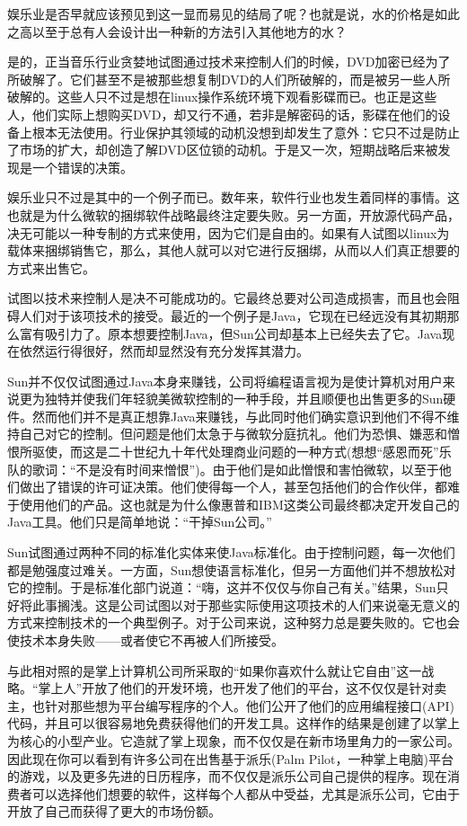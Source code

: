 娱乐业是否早就应该预见到这一显而易见的结局了呢？也就是说，水的价格是如此之高以至于总有人会设计出一种新的方法引入其他地方的水？

是的，正当音乐行业贪婪地试图通过技术来控制人们的时候，DVD加密已经为了所破解了。它们甚至不是被那些想复制DVD的人们所破解的，而是被另一些人所破解的。这些人只不过是想在linux操作系统环境下观看影碟而已。也正是这些人，他们实际上想购买DVD，却又行不通，若非是解密码的话，影碟在他们的设备上根本无法使用。行业保护其领域的动机没想到却发生了意外：它只不过是防止了市场的扩大，却创造了解DVD区位锁的动机。于是又一次，短期战略后来被发现是一个错误的决策。

娱乐业只不过是其中的一个例子而已。数年来，软件行业也发生着同样的事情。这也就是为什么微软的捆绑软件战略最终注定要失败。另一方面，开放源代码产品，决无可能以一种专制的方式来使用，因为它们是自由的。如果有人试图以linux为载体来捆绑销售它，那么，其他人就可以对它进行反捆绑，从而以人们真正想要的方式来出售它。

试图以技术来控制人是决不可能成功的。它最终总要对公司造成损害，而且也会阻碍人们对于该项技术的接受。最近的一个例子是Java，它现在已经远没有其初期那么富有吸引力了。原本想要控制Java，但Sun公司却基本上已经失去了它。Java现在依然运行得很好，然而却显然没有充分发挥其潜力。

Sun并不仅仅试图通过Java本身来赚钱，公司将编程语言视为是使计算机对用户来说更为独特并使我们年轻貌美微软控制的一种手段，并且顺便也出售更多的Sun硬件。然而他们并不是真正想靠Java来赚钱，与此同时他们确实意识到他们不得不维持自己对它的控制。但问题是他们太急于与微软分庭抗礼。他们为恐惧、嫌恶和憎恨所驱使，而这是二十世纪九十年代处理商业问题的一种方式(想想“感恩而死”乐队的歌词：“不是没有时间来憎恨”)。由于他们是如此憎恨和害怕微软，以至于他们做出了错误的许可证决策。他们使得每一个人，甚至包括他们的合作伙伴，都难于使用他们的产品。这也就是为什么像惠普和IBM这类公司最终都决定开发自己的Java工具。他们只是简单地说：“干掉Sun公司。”

Sun试图通过两种不同的标准化实体来使Java标准化。由于控制问题，每一次他们都是勉强度过难关。一方面，Sun想使语言标准化，但另一方面他们并不想放松对它的控制。于是标准化部门说道：“嗨，这并不仅仅与你自己有关。”结果，Sun只好将此事搁浅。这是公司试图以对于那些实际使用这项技术的人们来说毫无意义的方式来控制技术的一个典型例子。对于公司来说，这种努力总是要失败的。它也会使技术本身失败——或者使它不再被人们所接受。

与此相对照的是掌上计算机公司所采取的“如果你喜欢什么就让它自由”这一战略。“掌上人”开放了他们的开发环境，也开发了他们的平台，这不仅仅是针对卖主，也针对那些想为平台编写程序的个人。他们公开了他们的应用编程接口(API)代码，并且可以很容易地免费获得他们的开发工具。这样作的结果是创建了以掌上为核心的小型产业。它造就了掌上现象，而不仅仅是在新市场里角力的一家公司。因此现在你可以看到有许多公司在出售基于派乐(Palm Pilot，一种掌上电脑)平台的游戏，以及更多先进的日历程序，而不仅仅是派乐公司自己提供的程序。现在消费者可以选择他们想要的软件，这样每个人都从中受益，尤其是派乐公司，它由于开放了自己而获得了更大的市场份额。

